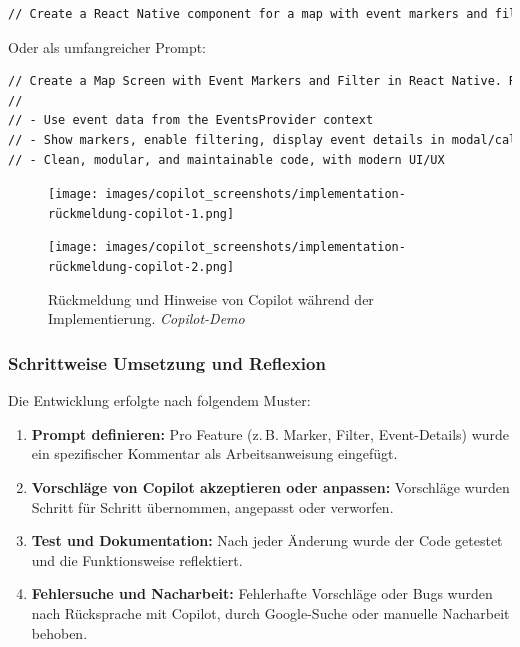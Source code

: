 \begin{lstlisting}[language=HTML]
// Create a React Native component for a map with event markers and filter functionality
\end{lstlisting}

Oder als umfangreicher Prompt:
\begin{lstlisting}[language=HTML]
// Create a Map Screen with Event Markers and Filter in React Native. Requirements:
//
// - Use event data from the EventsProvider context
// - Show markers, enable filtering, display event details in modal/callout
// - Clean, modular, and maintainable code, with modern UI/UX
\end{lstlisting}


\begin{figure}[htbp]
      \centering
      \begin{minipage}{0.48\textwidth}
            \centering
            \texttt{[image: images/copilot\_screenshots/implementation-rückmeldung-copilot-1.png]}
      \end{minipage}
      \hfill
      \begin{minipage}{0.48\textwidth}
            \centering
            \texttt{[image: images/copilot\_screenshots/implementation-rückmeldung-copilot-2.png]}
      \end{minipage}
      \caption{Rückmeldung und Hinweise von Copilot während der Implementierung. \textit{Copilot-Demo}}
      \label{fig:copilot-impl-pair}
\end{figure}

\subsubsection{Schrittweise Umsetzung und Reflexion}

Die Entwicklung erfolgte nach folgendem Muster:
\begin{enumerate}
      \item \textbf{Prompt definieren:} Pro Feature (z.\,B. Marker, Filter, Event-Details) wurde ein spezifischer Kommentar als Arbeitsanweisung eingefügt.
      \item \textbf{Vorschläge von Copilot akzeptieren oder anpassen:} Vorschläge wurden Schritt für Schritt übernommen, angepasst oder verworfen.
      \item \textbf{Test und Dokumentation:} Nach jeder Änderung wurde der Code getestet und die Funktionsweise reflektiert.
      \item \textbf{Fehlersuche und Nacharbeit:} Fehlerhafte Vorschläge oder Bugs wurden nach Rücksprache mit Copilot, durch Google-Suche oder manuelle Nacharbeit behoben.
\end{enumerate}

